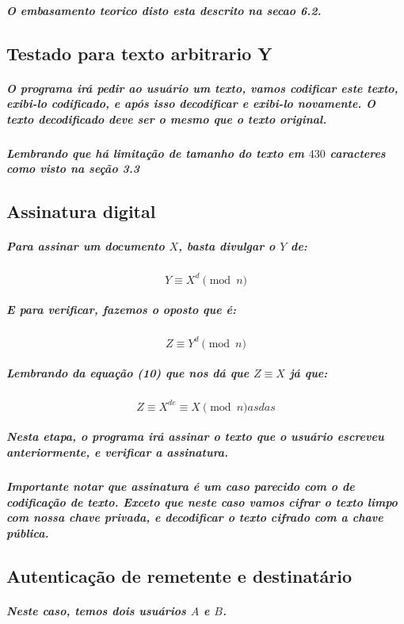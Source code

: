 \documentclass[12pt,twoside, a4paper, twocolumn]{article}
\begin{document}
\subparagraph*{O embasamento teorico disto esta descrito na secao 6.2.}

\subsection{Testado para texto arbitrario Y}

\subparagraph*{O programa irá pedir ao usuário um texto, vamos codificar este texto, exibi-lo codificado, e após isso decodificar e exibi-lo novamente. O texto decodificado deve ser o mesmo que o texto original.}

\subparagraph*{Lembrando que há limitação de tamanho do texto em $430$ caracteres como visto na seção 3.3}

\subsection{Assinatura digital}

\subparagraph*{Para assinar um documento $X$, basta divulgar o $Y$ de:}

\begin{equation}
    Y \equiv X^{d} \pmod{n}
\end{equation}

\subparagraph*{E para verificar, fazemos o oposto que é:}

\begin{equation}
    Z \equiv Y^{ d} \pmod{n}
\end{equation}

\subparagraph*{Lembrando da equação (10) que nos dá que $Z \equiv X$ já que:}

\begin{equation}
    Z \equiv X^{de} \equiv X \pmod{n}
    asdas
\end{equation}

\subparagraph*{Nesta etapa, o programa irá assinar o texto que o usuário escreveu anteriormente, e verificar a assinatura.}

\subparagraph*{Importante notar que assinatura é um caso parecido com o de codificação de texto. Exceto que neste caso vamos cifrar o texto limpo com nossa chave privada, e decodificar o texto cifrado com a chave pública.}

\subsection{Autenticação de remetente e destinatário}

\subparagraph*{Neste caso, temos dois usuários $A$ e $B$. }
\end{document}

